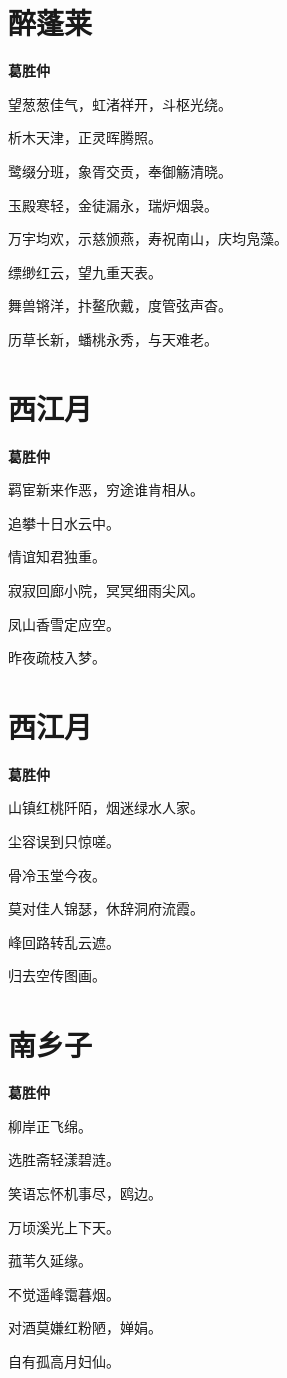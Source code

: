 \documentclass[12pt,a4paper]{ctexbook}
\begin{document}
\section{醉蓬莱}
\textbf{葛胜仲}\par\vspace{0.5em}
望葱葱佳气，虹渚祥开，斗枢光绕。\par
析木天津，正灵晖腾照。\par
鹭缀分班，象胥交贡，奉御觞清晓。\par
玉殿寒轻，金徒漏永，瑞炉烟袅。\par
万宇均欢，示慈颁燕，寿祝南山，庆均凫藻。\par
缥缈红云，望九重天表。\par
舞兽锵洋，抃鳌欣戴，度管弦声杳。\par
历草长新，蟠桃永秀，与天难老。\par

\section{西江月}
\textbf{葛胜仲}\par\vspace{0.5em}
羁宦新来作恶，穷途谁肯相从。\par
追攀十日水云中。\par
情谊知君独重。\par
寂寂回廊小院，冥冥细雨尖风。\par
凤山香雪定应空。\par
昨夜疏枝入梦。\par

\section{西江月}
\textbf{葛胜仲}\par\vspace{0.5em}
山镇红桃阡陌，烟迷绿水人家。\par
尘容误到只惊嗟。\par
骨冷玉堂今夜。\par
莫对佳人锦瑟，休辞洞府流霞。\par
峰回路转乱云遮。\par
归去空传图画。\par

\section{南乡子}
\textbf{葛胜仲}\par\vspace{0.5em}
柳岸正飞绵。\par
选胜斋轻漾碧涟。\par
笑语忘怀机事尽，鸥边。\par
万顷溪光上下天。\par
菰苇久延缘。\par
不觉遥峰霭暮烟。\par
对酒莫嫌红粉陋，婵娟。\par
自有孤高月妇仙。\par
\end{document}

